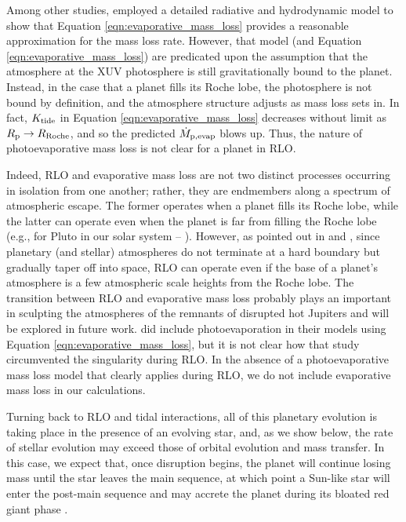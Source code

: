 \documentclass{svjour3}                     %
\begin{document}
Among other studies, \cite{2009ApJ...693...23M} employed a detailed radiative and hydrodynamic model to show that Equation \ref{eqn:evaporative_mass_loss} provides a reasonable approximation for the mass loss rate. However, that model (and Equation \ref{eqn:evaporative_mass_loss}) are predicated upon the assumption that the atmosphere at the XUV photosphere is still gravitationally bound to the planet. Instead, in the case that a planet fills its Roche lobe, the photosphere is not bound by definition, and the atmosphere structure adjusts as mass loss sets in. In fact, $K_{\rm tide}$ in Equation \ref{eqn:evaporative_mass_loss} decreases without limit as $R_{\rm p} \rightarrow R_{\rm Roche}$, and so the predicted $\dot{M}_{\rm p, evap}$ blows up. Thus, the nature of photoevaporative mass loss is not clear for a planet in RLO. 

Indeed, RLO and evaporative mass loss are not two distinct processes occurring in isolation from one another; rather, they are endmembers along a spectrum of atmospheric escape. The former operates when a planet fills its Roche lobe, while the latter can operate even when the planet is far from filling the Roche lobe (e.g., for Pluto in our solar system -- \cite{Watson1981Dynamics}). However, as pointed out in \cite{Ritter1988Turning} and \cite{Li2010WASP12b}, since planetary (and stellar) atmospheres do not terminate at a hard boundary but gradually taper off into space, RLO can operate even if the base of a planet's atmosphere is a few atmospheric scale heights from the Roche lobe. The transition between RLO and evaporative mass loss probably plays an important in sculpting the atmospheres of the remnants of disrupted hot Jupiters and will be explored in future work. \cite{2015ApJ...813..101V} did include photoevaporation in their models using Equation \ref{eqn:evaporative_mass_loss}, but it is not clear how that study circumvented the singularity during RLO. In the absence of a photoevaporative mass loss model that clearly applies during RLO, we do not include evaporative mass loss in our calculations.

Turning back to RLO and tidal interactions, all of this planetary evolution is taking place in the presence of an evolving star, and, as we show below, the rate of stellar evolution may exceed those of orbital evolution and mass transfer. In this case, we expect that, once disruption begins, the planet will continue losing mass until the star leaves the main sequence, at which point a Sun-like star will enter the post-main sequence and may accrete the planet during its bloated red giant phase \cite{2009ApJ...700..832C}.
\end{document}
